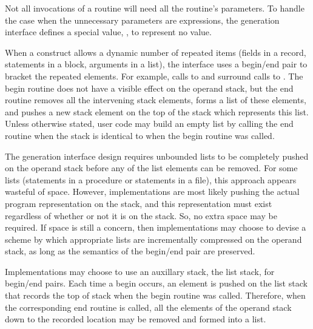 Not all invocations of a routine will need all the routine's
parameters.  To handle the case when the unnecessary parameters are
expressions, the generation interface defines a special value,
, to represent no value.  

When a construct allows a dynamic number of repeated items (\eg fields
in a record, statements in a block, arguments in a list), the
interface uses a begin/end pair to bracket the repeated elements.  For
example, calls to  and 
surround calls to .  The begin routine does not
have a visible effect on the operand stack, but the end routine
removes all the intervening stack elements, forms a list of these
elements, and pushes a new stack element on the top of the stack which
represents this list.  Unless otherwise stated, user code may build an
empty list by calling the end routine when the stack is identical to
when the begin routine was called.

The generation interface design requires unbounded lists to be
completely pushed on the operand stack before any of the list elements
can be removed.  For some lists (\eg statements in a procedure or
statements in a file), this approach appears wasteful of space.
However, implementations are most likely pushing the actual program
representation on the stack, and this representation must exist
regardless of whether or not it is on the stack.  So, no extra space
may be required.  If space is still a concern, then implementations
may choose to devise a scheme by which appropriate lists are
incrementally compressed on the operand stack, as long as the
semantics of the begin/end pair are preserved.

Implementations may choose to use an auxillary stack, the list stack,
for begin/end pairs.  Each time a begin occurs, an element is pushed
on the list stack that records the top of stack when the begin routine
was called.  Therefore, when the corresponding end routine is called,
all the elements of the operand stack down to the recorded location
may be removed and formed into a list.

